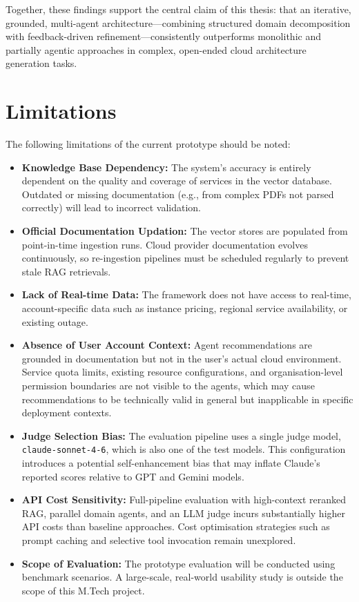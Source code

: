 Together, these findings support the central claim of this thesis: that an iterative, grounded, multi-agent architecture—combining structured domain decomposition with feedback-driven refinement—consistently outperforms monolithic and partially agentic approaches in complex, open-ended cloud architecture generation tasks.


\section{Limitations}
The following limitations of the current prototype should be noted:
\begin{itemize}
    \item \textbf{Knowledge Base Dependency:} The system's accuracy is entirely dependent on the quality and coverage of services in the vector database. Outdated or missing documentation (e.g., from complex PDFs not parsed correctly) will lead to incorrect validation.
    \item \textbf{Official Documentation Updation:} The vector stores are populated from point-in-time ingestion runs. Cloud provider documentation evolves continuously, so re-ingestion pipelines must be scheduled regularly to prevent stale RAG retrievals. 
    \item \textbf{Lack of Real-time Data:} The framework does not have access to real-time, account-specific data such as instance pricing, regional service availability, or existing outage.


    \item \textbf{Absence of User Account Context:} Agent recommendations are grounded in documentation but not in the user's actual cloud environment. Service quota limits, existing resource configurations, and organisation-level permission boundaries are not visible to the agents, which may cause recommendations to be technically valid in general but inapplicable in specific deployment contexts.

    \item \textbf{Judge Selection Bias:} The evaluation pipeline uses a single judge model, \texttt{claude-sonnet-4-6}, which is also one of the test models. This configuration introduces a potential self-enhancement bias that may inflate Claude's reported scores relative to GPT and Gemini models.

    \item \textbf{API Cost Sensitivity:} Full-pipeline evaluation with high-context reranked RAG, parallel domain agents, and an LLM judge incurs substantially higher API costs than baseline approaches. Cost optimisation strategies such as prompt caching and selective tool invocation remain unexplored.

    \item \textbf{Scope of Evaluation:} The prototype evaluation will be conducted using benchmark scenarios. A large-scale, real-world usability study is outside the scope of this M.Tech project.
\end{itemize}

